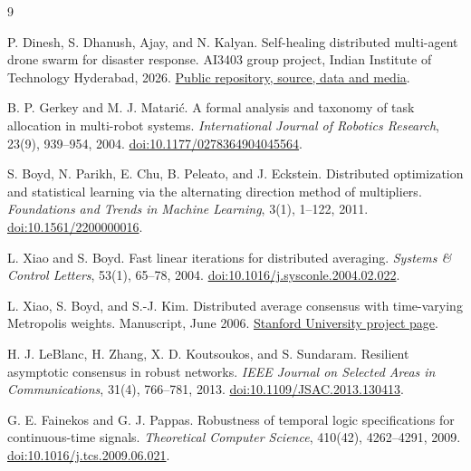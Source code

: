 \begin{thebibliography}{9}
\raggedright
{}
P. Dinesh, S. Dhanush, Ajay, and N. Kalyan.
\newblock Self-healing distributed multi-agent drone swarm for disaster response.
\newblock AI3403 group project, Indian Institute of Technology Hyderabad, 2026.
\newblock \href{\repo}{Public repository, source, data and media}.

B. P. Gerkey and M. J. Matari\'c.
\newblock A formal analysis and taxonomy of task allocation in multi-robot systems.
\newblock \emph{International Journal of Robotics Research}, 23(9), 939--954, 2004.
\newblock \href{https://doi.org/10.1177/0278364904045564}{doi:10.1177/0278364904045564}.

S. Boyd, N. Parikh, E. Chu, B. Peleato, and J. Eckstein.
\newblock Distributed optimization and statistical learning via the alternating direction method of multipliers.
\newblock \emph{Foundations and Trends in Machine Learning}, 3(1), 1--122, 2011.
\newblock \href{https://doi.org/10.1561/2200000016}{doi:10.1561/2200000016}.

L. Xiao and S. Boyd.
\newblock Fast linear iterations for distributed averaging.
\newblock \emph{Systems \& Control Letters}, 53(1), 65--78, 2004.
\newblock \href{https://doi.org/10.1016/j.sysconle.2004.02.022}{doi:10.1016/j.sysconle.2004.02.022}.

L. Xiao, S. Boyd, and S.-J. Kim.
\newblock Distributed average consensus with time-varying Metropolis weights.
\newblock Manuscript, June 2006.
\newblock \href{https://stanford.edu/~boyd/papers/avg_metropolis.html}{Stanford University project page}.

H. J. LeBlanc, H. Zhang, X. D. Koutsoukos, and S. Sundaram.
\newblock Resilient asymptotic consensus in robust networks.
\newblock \emph{IEEE Journal on Selected Areas in Communications}, 31(4), 766--781, 2013.
\newblock \href{https://doi.org/10.1109/JSAC.2013.130413}{doi:10.1109/JSAC.2013.130413}.

G. E. Fainekos and G. J. Pappas.
\newblock Robustness of temporal logic specifications for continuous-time signals.
\newblock \emph{Theoretical Computer Science}, 410(42), 4262--4291, 2009.
\newblock \href{https://doi.org/10.1016/j.tcs.2009.06.021}{doi:10.1016/j.tcs.2009.06.021}.

\end{thebibliography}
